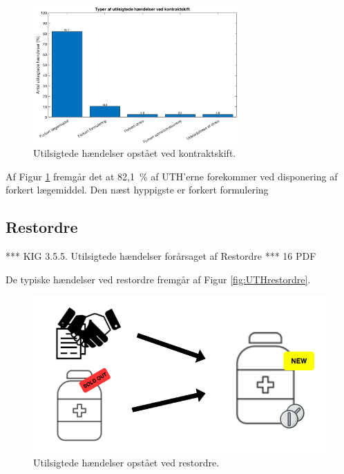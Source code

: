 \begin{figure}[H]\centering
	\includegraphics[width=0.7\textwidth]{billeder/UTH1.png} 
	\caption{Utilsigtede hændelser opstået ved kontraktskift\citep{Hakonsen2010}.}
	\label{fig:UTHkontraktskift}  
\end{figure}

Af Figur \ref{fig:UTHkontraktskift} fremgår det at 82,1~\% af UTH'erne forekommer ved disponering af forkert lægemiddel. Den næst hyppigste er forkert formulering 


\subsection{Restordre}

*** KIG 3.5.5. Utilsigtede hændelser forårsaget af Restordre *** 16 PDF

De typiske hændelser ved restordre fremgår af Figur \ref{fig:UTHrestordre}.

\begin{figure}[H]\centering
	\includegraphics[width=1\textwidth]{billeder/forside.png} 
	\caption{Utilsigtede hændelser opstået ved restordre\citep{Hakonsen2010}.}
	\label{fig:UTHRestordre}  
\end{figure}


